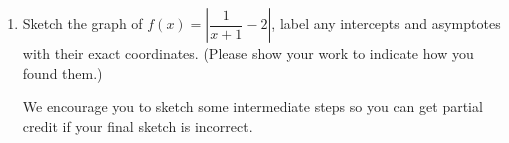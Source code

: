 \documentclass{article}
\theoremstyle{theorem}
\begin{document}
\begin{enumerate}
\begin{enumerate}
  \item
    \begin{problem}[\vfill\newpage]
      When was the cyclist furthest from Litchfield? 
    \end{problem}

    \begin{solution}
      We want to know when the cyclist was furthest east or west of Litchfield. From the graph, she was furthest west at the start of her ride, when $s$ is about $-14$ (so she was about 14 miles west). She was furthest east roughly at $t = 6$, when she was about 9 miles east of Litchfield. So, the cyclist was furthest from Litchfield . 
    \end{solution}

  \end{enumerate}

\item {}  \finishexam

  \begin{problem}
    Sketch the graph of $\displaystyle f(x) = \left| \dfrac{1}{x + 1} - 2 \right|$, label any intercepts and asymptotes with their exact coordinates. (Please show your work to indicate how you found them.)

    We encourage you to sketch some intermediate steps so you can get partial credit if your final sketch is incorrect.
  \end{problem}


\end{enumerate}
\end{document}
